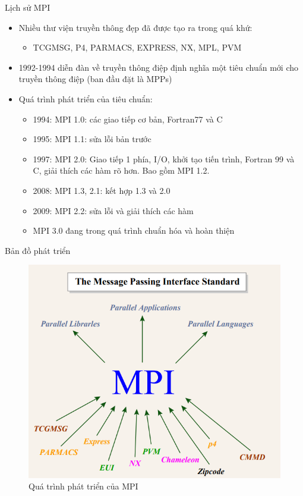 \documentclass[10pt]{beamer}
\theoremstyle{remark}
\numberwithin{algocf}{section}
\numberwithin{equation}{section}
\numberwithin{dl}{section}
\numberwithin{figure}{section}
\begin{document}
\begin{frame}[shrink]{Lịch sử MPI}
    \begin{itemize}
        \item Nhiều thư viện truyền thông đẹp đã được tạo ra trong quá khứ:
        \begin{itemize}
            \item TCGMSG, P4, PARMACS, EXPRESS, NX, MPL, PVM
        \end{itemize}
        \item 1992-1994 diễn đàn về truyền thông điệp định nghĩa một tiêu chuẩn mới cho truyền thông điệp (ban đầu đặt là MPPs)
        \item Quá trình phát triển của tiêu chuẩn:
        \begin{itemize}
            \item 1994: MPI 1.0: các giao tiếp cơ bản, Fortran77 và C
            \item 1995: MPI 1.1: sửa lỗi bản trước
            \item 1997: MPI 2.0: Giao tiếp 1 phía, I/O, khởi tạo tiến trình, Fortran 99 và C, giải thích các hàm rõ hơn. Bao gồm MPI 1.2.
            \item 2008: MPI 1.3, 2.1: kết hợp 1.3 và 2.0
            \item 2009: MPI 2.2: sửa lỗi và giải thích các hàm
            \item MPI 3.0 đang trong quá trình chuẩn hóa và hoàn thiện
        \end{itemize}
    \end{itemize}
\end{frame}

\begin{frame}{Bản đồ phát triển}
    \begin{figure}[H]
        \centering
        \includegraphics[width=0.75\linewidth]{figures/MPI/MPI_Genealogy.png}
        \caption{Quá trình phát triển của MPI}
    \end{figure}
\end{frame}
\end{document}

